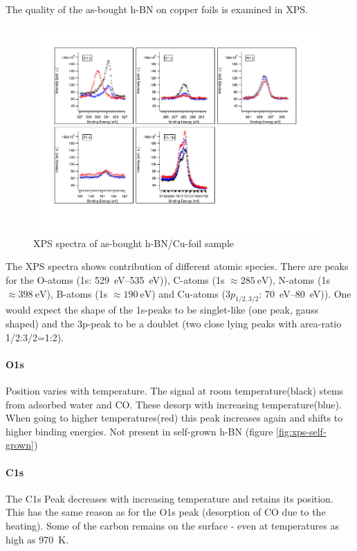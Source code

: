 The quality of the as-bought h-BN on copper foils\cite{_graphene_2014} is examined in XPS.
\begin{figure}
\includegraphics[angle=90,width=1.2\textwidth]{./images/XPS-spectra-as-bought.pdf}
\caption{XPS spectra of as-bought h-BN/Cu-foil sample\cite{_graphene_2014}}
\end{figure}
The XPS spectra shows contribution of different atomic species. There are peaks for the O-atoms (1s: \SIrange{529}{535}{\eV})), C-atoms (1s $\approx \SI{285}{\eV}$), N-atoms (1s $\approx \SI{398}{\eV}$), B-atoms (1s $\approx \SI{190}{\eV}$) and Cu-atoms ($3p_{1/2,3/2}$: \SIrange{70}{80}{\eV})). One would expect the shape of the 1s-peaks to be singlet-like (one peak, gauss shaped) and the 3p-peak to be a doublet (two close lying peaks with area-ratio 1/2:3/2=1:2).

\paragraph{O1s}
Position varies with temperature. The signal at room temperature(black) stems from adsorbed water and CO. These desorp with increasing temperature(blue). When going to higher temperatures(red) this peak increases again and shifts to higher binding energies. Not present in self-grown h-BN (figure \ref{fig:xps-self-grown})

\paragraph{C1s}
The C1s Peak decreases with increasing temperature and retains its position. This has the same  reason as for the O1s peak (desorption of CO due to the heating). Some of the carbon remains on the surface - even at temperatures as high as \SI{970}{\K}.

